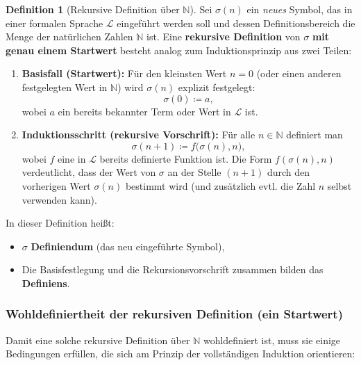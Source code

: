 \documentclass{book}
\theoremstyle{plain}
\theoremstyle{remark}
\theoremstyle{definition}
\newtheorem{definition}{Definition}[section]
\begin{document}
\begin{definition}[Rekursive Definition über \(\mathbb{N}\)]
Sei \(\sigma(n)\) ein \emph{neues} Symbol, das in einer formalen Sprache \(\mathcal{L}\) eingeführt werden soll und dessen Definitionsbereich die Menge der natürlichen Zahlen \(\mathbb{N}\) ist. Eine \textbf{rekursive Definition} von \(\sigma\) \textbf{mit genau einem Startwert} besteht analog zum Induktionsprinzip aus zwei Teilen:

\begin{enumerate}
    \item \textbf{Basisfall (Startwert):} Für den kleinsten Wert \(n=0\) (oder einen anderen festgelegten Wert in \(\mathbb{N}\)) wird \(\sigma(n)\) explizit festgelegt:
    \[
    \sigma(0) \coloneqq a,
    \]
    wobei \(a\) ein bereits bekannter Term oder Wert in \(\mathcal{L}\) ist.
    \item \textbf{Induktionsschritt (rekursive Vorschrift):} Für alle \(n \in \mathbb{N}\) definiert man
    \[
    \sigma(n+1) \coloneqq f\bigl(\sigma(n), n\bigr),
    \]
    wobei \(f\) eine in \(\mathcal{L}\) bereits definierte Funktion ist. Die Form \(f(\sigma(n), n)\) verdeutlicht, dass der Wert von \(\sigma\) an der Stelle \((n+1)\) durch den vorherigen Wert \(\sigma(n)\) bestimmt wird (und zusätzlich evtl. die Zahl \(n\) selbst verwenden kann).
\end{enumerate}

\noindent
In dieser Definition heißt:
\begin{itemize}
    \item \(\sigma\) \textbf{Definiendum} (das neu eingeführte Symbol),
    \item Die Basisfestlegung und die Rekursionsvorschrift zusammen bilden das \textbf{Definiens}.
\end{itemize}
\end{definition}

\subsubsection{Wohldefiniertheit der rekursiven Definition (ein Startwert)}
Damit eine solche rekursive Definition über \(\mathbb{N}\) wohldefiniert ist, muss sie einige Bedingungen erfüllen, die sich am Prinzip der vollständigen Induktion orientieren:
\end{document}
